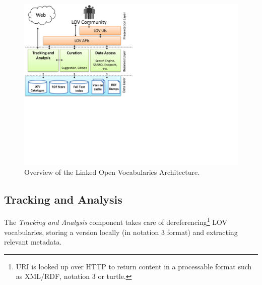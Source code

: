 \documentclass{iosart2c}
\begin{document}

\begin{figure}[ht!b]
\includegraphics[trim={0cm 8cm 0cm 0cm},scale=.6]{lov_architecture.pdf}
\caption{Overview of the Linked Open Vocabularies Architecture.}
\label{fig:arch}
\end{figure}

\subsection{Tracking and Analysis}
	The \emph{Tracking and Analysis} component takes care of dereferencing\footnote{URI is looked up over HTTP to return content in a processable format such as XML/RDF, notation 3 or turtle.} LOV vocabularies, storing a version locally (in notation 3 format) and extracting relevant metadata.
\end{document}
